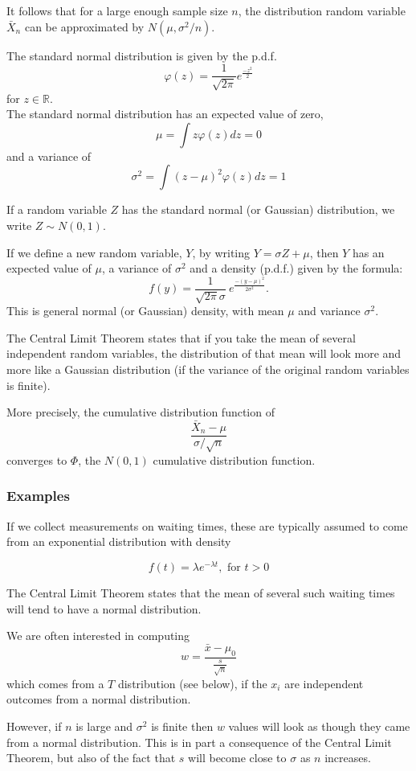 \documentclass[12pt,a4paper]{article}
\theoremstyle{regla}
\theoremstyle{remark}
\theoremstyle{definition}
\theoremstyle{nonumberbreak}
\begin{document}
It follows that for a large enough sample size $n$, 
the distribution random variable $\bar{X}_n$ can be approximated by $N(\mu,\sigma^2/n)$.

The standard normal distribution is given by the p.d.f.\\
$$
\varphi(z) = \frac{1}{\sqrt{2\pi}} e^{\frac{-z^2}{2}}$$ 
 for $z\in \mathbb{R}$.\\

The standard normal distribution has an expected value of zero, 
$$
\mu = \int z\varphi (z)dz =0
$$
and a variance of 
$$
\sigma^2 = \int ({z-\mu})^2 \varphi(z)dz=1
$$

If a random variable $Z$ has the standard normal (or Gaussian)  distribution, we write $Z\sim N(0,1)$. 

If we define a new random variable, $Y$, by writing $Y=\sigma Z + \mu$, then $Y$ has an expected value of $\mu$, a variance of $\sigma^2$ and a density (p.d.f.) given by the formula:
$$
f(y) = \frac{1}{\sqrt{2\pi}\sigma}   \ e^{\frac{-(y-\mu)^2}{2\sigma^2}}.
$$
This is general normal (or Gaussian) density, with mean $\mu$ and variance $\sigma^2$.

The Central Limit Theorem states that if you take the mean of several independent random variables, the distribution of
that mean will look more and more like a Gaussian distribution (if the variance of the original random variables is finite).

More precisely, the cumulative distribution function of
$$
\frac{\bar{X}_n - \mu}{\sigma/\sqrt{n}}
$$
converges to $\Phi$, the $N(0,1)$ cumulative distribution function.


\subsubsection{Examples}
\begin{xmpl}
If we collect measurements on waiting times, these are typically assumed to come 
from an exponential distribution with density 

\begin{equation*}
f(t)=\lambda e^{-\lambda t},\textrm{ for } t>0 
\end{equation*}

The Central Limit Theorem states that the mean of several such waiting times will tend to have a normal distribution.
\end{xmpl}

\begin{xmpl}
We are often interested in computing
$$
w=\frac{\bar{x}-\mu_0}{\frac{s}{\sqrt{n}}}
$$
which comes from a $T$ distribution (see below), if the $x_i$ are independent outcomes from a normal distribution. 

However, if $n$ is large and $\sigma^2$ is finite then $w$ values will look as though they came from a normal distribution. 
This is in part a consequence of the Central Limit Theorem, but also of the fact that $s$ will become close to $\sigma$ as $n$ increases.
\end{xmpl}
\end{document}
